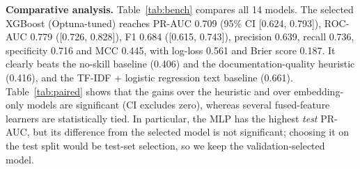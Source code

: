 \documentclass[conference]{IEEEtran}
\begin{document}
\textbf{Comparative analysis.} Table~\ref{tab:bench} compares all 14 models. The selected XGBoost (Optuna-tuned) reaches PR-AUC 0.709 (95\% CI [0.624, 0.793]), ROC-AUC 0.779 ([0.726, 0.828]), F1 0.684 ([0.615, 0.743]), precision 0.639, recall 0.736, specificity 0.716 and MCC 0.445, with log-loss 0.561 and Brier score 0.187. It clearly beats the no-skill baseline (0.406) and the documentation-quality heuristic (0.416), and the TF-IDF + logistic regression text baseline (0.661). Table~\ref{tab:paired} shows that the gains over the heuristic and over embedding-only models are significant (CI excludes zero), whereas several fused-feature learners are statistically tied. In particular, the MLP has the highest \emph{test} PR-AUC, but its difference from the selected model is not significant; choosing it on the test split would be test-set selection, so we keep the validation-selected model.

\begin{table}[t]\centering\caption{Paired bootstrap of test PR-AUC: selected model minus baseline (1{,}000 resamples)}\label{tab:paired}
\end{table}
\end{document}
